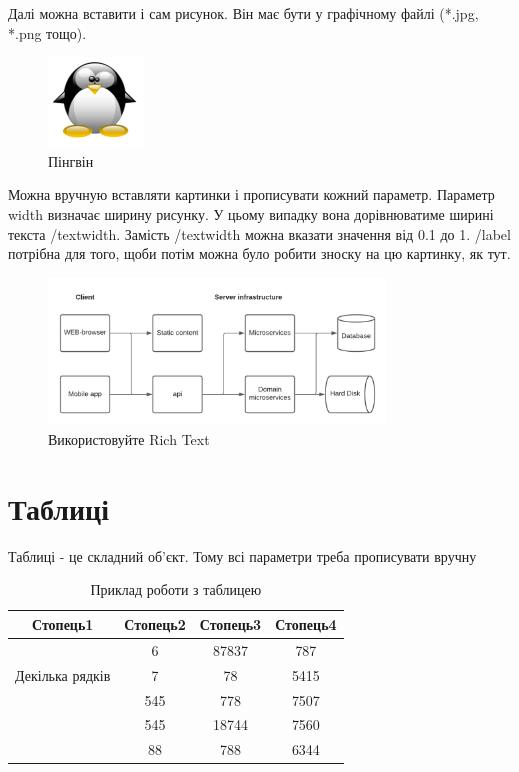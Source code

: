 Далі можна вставити і сам рисунок. Він має бути у графічному файлі ({*}.jpg, {*}.png тощо). 

\begin{figure}[h]
 \centering\includegraphics{img/Tux.png}
 \caption{Пінгвін}
\end{figure}

Можна вручную вставляти картинки і прописувати кожний параметр.
Параметр width визначає ширину рисунку. У цьому випадку вона дорівнюватиме ширині текста /textwidth. Замість /textwidth можна вказати значення від 0.1 до 1. /label потрібна для того, щоби потім можна було робити зноску на цю картинку, як тут.

\begin{figure}[!htb]
 \centering
 \includegraphics[width=0.8\textwidth]{img/fig1.png}
 \caption{Використовуйте Rich Text}
 \label{fig:fig1}
\end{figure}

\section{Таблиці}
Таблиці  - це складний об'єкт. Тому всі параметри треба прописувати вручну

\begin{table}[h!]
\centering
\begin{tabular}{|c|c|c|c|} 
 \hline
 Стопець1 & Стопець2 & Стопець3 & Стопець4 \\ [0.5ex] 
 \hline
 \multirow{3}{5em}{Декілька рядків} & 6 & 87837 & 787 \\ 
  &  7 & 78 & 5415 \\
   & 545 & 778 & 7507 \\
   & 545 & 18744 & 7560 \\
   & 88 & 788 & 6344 \\ [1ex] 
 \hline
\end{tabular}
\caption{Приклад роботи з таблицею}
\label{table:1}
\end{table}

